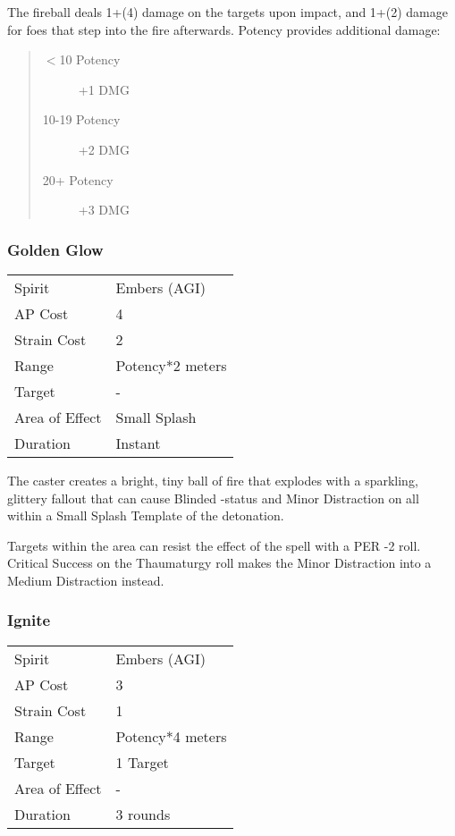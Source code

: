 \documentclass[11pt,a4paper,twocolumn]{book}
\begin{document}
The fireball deals 1+(4) damage on the targets upon impact, and 1+(2) damage for foes that step into the fire afterwards. Potency provides additional damage: 

\begin{quote}
	\begin{description}
		\item[$<$10 Potency] 	+1 DMG
		\item[10-19 Potency] 	+2 DMG
		\item[20+ Potency]  	+3 DMG
	\end{description}	
\end{quote}

\subsubsection*{Golden Glow}
{
	\begin{tabu} to 75mm{| X[l,4] | X[l,7] |}
		\hline
		Spirit 			&  Embers (AGI)			\\
		AP Cost	      	&  4					\\
		Strain Cost     &  2					\\
		Range     		&  Potency*2 meters		\\
		Target      	&  -					\\
		Area of Effect  &  Small Splash	 		\\
		Duration     	&  Instant				\\ \hline
	\end{tabu}
	
}

\medskip

The caster creates a bright, tiny ball of fire that explodes with a sparkling, glittery fallout that can cause Blinded -status and Minor Distraction on all within a Small Splash Template of the detonation.

Targets within the area can resist the effect of the spell with a PER -2 roll. Critical Success on the Thaumaturgy roll makes the Minor Distraction into a Medium Distraction instead.

\subsubsection*{Ignite}
{
	\begin{tabu} to 70mm{| X[l,4] | X[l,7] |}
		\hline
		Spirit         & Embers (AGI)     \\
		AP Cost        & 3                \\
		Strain Cost    & 1                \\
		Range          & Potency*4 meters \\
		Target         & 1 Target         \\
		Area of Effect & -                \\
		Duration       & 3 rounds         \\ \hline
	\end{tabu}
	
}
\medskip
\end{document}
